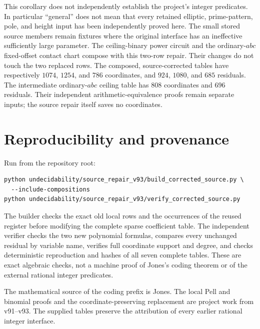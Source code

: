 \documentclass[11pt]{article}
\begin{document}
This corollary does not independently establish the project's integer
predicates. In particular ``general'' does not mean that every retained
elliptic, prime-pattern, pole, and height input has been independently
proved here. The small stored source members remain fixtures where the
original interface has an ineffective sufficiently large parameter.
The ceiling-binary power circuit and the ordinary-\(abc\) fixed-offset
contact chart compose with this two-row repair. Their changes do not
touch the two replaced rows. The composed, source-corrected tables have
respectively \(1074\), \(1254\), and \(786\) coordinates, and
\(924\), \(1080\), and \(685\) residuals. The intermediate
ordinary-\(abc\) ceiling table has \(808\) coordinates and \(696\)
residuals. Their independent arithmetic-equivalence proofs remain
separate inputs; the source repair itself saves no coordinates.

\section{Reproducibility and provenance}

Run from the repository root:
\begin{verbatim}
python undecidability/source_repair_v93/build_corrected_source.py \
  --include-compositions
python undecidability/source_repair_v93/verify_corrected_source.py
\end{verbatim}
The builder checks the exact old local rows and the occurrences of
the reused register before modifying the complete sparse coefficient
table. The independent verifier checks the two new polynomial formulas,
compares every unchanged residual by variable name, verifies full
coordinate support and degree, and checks deterministic reproduction
and hashes of all seven complete tables. These are exact algebraic
checks, not a machine proof of Jones's coding theorem or of the
external rational integer predicates.

The mathematical source of the coding prefix is Jones. The local
Pell and binomial proofs and the coordinate-preserving replacement are
project work from v91--v93. The supplied tables preserve the attribution
of every earlier rational integer interface.
\end{document}

